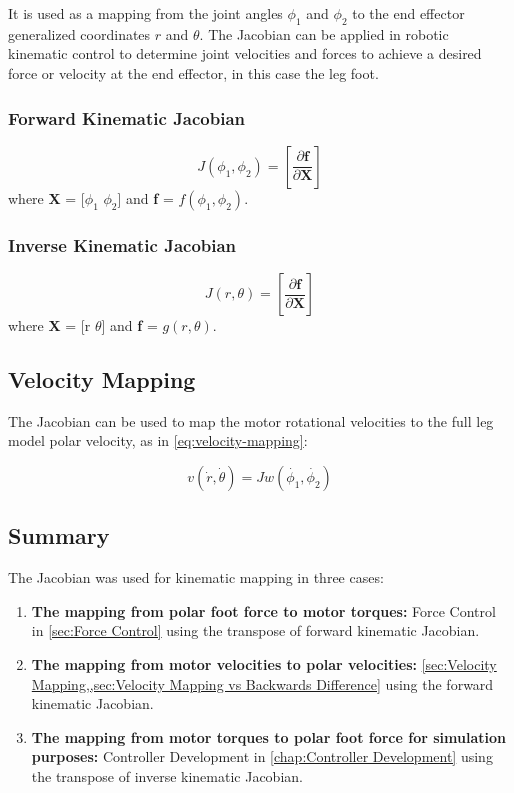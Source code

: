 It is used as a mapping from the joint angles $\phi_1$ and $\phi_2$ to the end effector generalized coordinates $r$ and $\theta$. The Jacobian can be applied in robotic kinematic control to determine joint velocities and forces to achieve a desired force or velocity at the end effector, in this case the leg foot.

\subsubsection{Forward Kinematic Jacobian}
\begin{equation} \label{eq:jacobian}
J(\phi_1,\phi_2) = \left[ \frac{\partial \textbf{f}}{\partial \textbf{X}} \right] 
\end{equation}
where \textbf{X} = [$\phi_1$ $\phi_2$] and \textbf{f} = $f(\phi_1, \phi_2)$.

\subsubsection{Inverse Kinematic Jacobian}
\begin{equation} 
J(r,\theta) = \left[ \frac{\partial \textbf{f}}{\partial \textbf{X}} \right] 
\end{equation}
where \textbf{X} = [r $\theta$] and \textbf{f} = $g(r, \theta)$.

\subsection{Velocity Mapping}
\label{sec:Velocity Mapping}

The Jacobian can be used to map the motor rotational velocities to the full leg model polar velocity, as in \cref{eq:velocity-mapping}:

\begin{equation} \label{eq:velocity-mapping}
v(\dot{r}, \dot{\theta}) = J w(\dot{\phi_1}, \dot{\phi_2})
\end{equation}

\subsection{Summary}

The Jacobian was used for kinematic mapping in three cases:
\begin{enumerate}
\item \textbf{The mapping from polar foot force to motor torques:} Force Control in \cref{sec:Force Control} using the transpose of forward kinematic Jacobian.
\item \textbf{The mapping from motor velocities to polar velocities:} \cref{sec:Velocity Mapping,,sec:Velocity Mapping vs Backwards Difference} using the forward kinematic Jacobian.
\item \textbf{The mapping from motor torques to polar foot force for simulation purposes:} Controller Development in \cref{chap:Controller Development} using the transpose of inverse kinematic Jacobian.
\end{enumerate}

